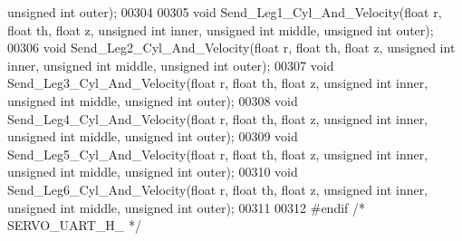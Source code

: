\begin{DoxyCode}
{      unsigned} \textcolor{keywordtype}{int} outer);
00304 
00305 \textcolor{keywordtype}{void} Send\_Leg1\_Cyl\_And\_Velocity(\textcolor{keywordtype}{float} r, \textcolor{keywordtype}{float} th, \textcolor{keywordtype}{float} z, \textcolor{keywordtype}{unsigned} \textcolor{keywordtype}{int} inner, \textcolor{keywordtype}{unsigned} \textcolor{keywordtype}{int} middle, \textcolor{keywordtype}{
      unsigned} \textcolor{keywordtype}{int} outer);
00306 \textcolor{keywordtype}{void} Send\_Leg2\_Cyl\_And\_Velocity(\textcolor{keywordtype}{float} r, \textcolor{keywordtype}{float} th, \textcolor{keywordtype}{float} z, \textcolor{keywordtype}{unsigned} \textcolor{keywordtype}{int} inner, \textcolor{keywordtype}{unsigned} \textcolor{keywordtype}{int} middle, \textcolor{keywordtype}{
      unsigned} \textcolor{keywordtype}{int} outer);
00307 \textcolor{keywordtype}{void} Send\_Leg3\_Cyl\_And\_Velocity(\textcolor{keywordtype}{float} r, \textcolor{keywordtype}{float} th, \textcolor{keywordtype}{float} z, \textcolor{keywordtype}{unsigned} \textcolor{keywordtype}{int} inner, \textcolor{keywordtype}{unsigned} \textcolor{keywordtype}{int} middle, \textcolor{keywordtype}{
      unsigned} \textcolor{keywordtype}{int} outer);
00308 \textcolor{keywordtype}{void} Send\_Leg4\_Cyl\_And\_Velocity(\textcolor{keywordtype}{float} r, \textcolor{keywordtype}{float} th, \textcolor{keywordtype}{float} z, \textcolor{keywordtype}{unsigned} \textcolor{keywordtype}{int} inner, \textcolor{keywordtype}{unsigned} \textcolor{keywordtype}{int} middle, \textcolor{keywordtype}{
      unsigned} \textcolor{keywordtype}{int} outer);
00309 \textcolor{keywordtype}{void} Send\_Leg5\_Cyl\_And\_Velocity(\textcolor{keywordtype}{float} r, \textcolor{keywordtype}{float} th, \textcolor{keywordtype}{float} z, \textcolor{keywordtype}{unsigned} \textcolor{keywordtype}{int} inner, \textcolor{keywordtype}{unsigned} \textcolor{keywordtype}{int} middle, \textcolor{keywordtype}{
      unsigned} \textcolor{keywordtype}{int} outer);
00310 \textcolor{keywordtype}{void} Send\_Leg6\_Cyl\_And\_Velocity(\textcolor{keywordtype}{float} r, \textcolor{keywordtype}{float} th, \textcolor{keywordtype}{float} z, \textcolor{keywordtype}{unsigned} \textcolor{keywordtype}{int} inner, \textcolor{keywordtype}{unsigned} \textcolor{keywordtype}{int} middle, \textcolor{keywordtype}{
      unsigned} \textcolor{keywordtype}{int} outer);
00311 
00312 \textcolor{preprocessor}{#endif }\textcolor{comment}{/* SERVO\_UART\_H\_ */}\textcolor{preprocessor}{}
\end{DoxyCode}
